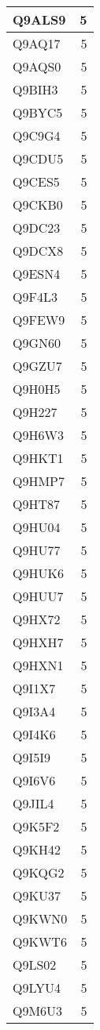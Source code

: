 \documentclass[
]{book}
\theoremstyle{definition}
\theoremstyle{definition}
\theoremstyle{definition}
\theoremstyle{definition}
\theoremstyle{remark}
\begin{document}
\begin{table}
\begin{tabular}{l|r}
\hline
Q9ALS9 & 5\\
\hline
Q9AQ17 & 5\\
\hline
Q9AQS0 & 5\\
\hline
Q9BIH3 & 5\\
\hline
Q9BYC5 & 5\\
\hline
Q9C9G4 & 5\\
\hline
Q9CDU5 & 5\\
\hline
Q9CES5 & 5\\
\hline
Q9CKB0 & 5\\
\hline
Q9DC23 & 5\\
\hline
Q9DCX8 & 5\\
\hline
Q9ESN4 & 5\\
\hline
Q9F4L3 & 5\\
\hline
Q9FEW9 & 5\\
\hline
Q9GN60 & 5\\
\hline
Q9GZU7 & 5\\
\hline
Q9H0H5 & 5\\
\hline
Q9H227 & 5\\
\hline
Q9H6W3 & 5\\
\hline
Q9HKT1 & 5\\
\hline
Q9HMP7 & 5\\
\hline
Q9HT87 & 5\\
\hline
Q9HU04 & 5\\
\hline
Q9HU77 & 5\\
\hline
Q9HUK6 & 5\\
\hline
Q9HUU7 & 5\\
\hline
Q9HX72 & 5\\
\hline
Q9HXH7 & 5\\
\hline
Q9HXN1 & 5\\
\hline
Q9I1X7 & 5\\
\hline
Q9I3A4 & 5\\
\hline
Q9I4K6 & 5\\
\hline
Q9I5I9 & 5\\
\hline
Q9I6V6 & 5\\
\hline
Q9JIL4 & 5\\
\hline
Q9K5F2 & 5\\
\hline
Q9KH42 & 5\\
\hline
Q9KQG2 & 5\\
\hline
Q9KU37 & 5\\
\hline
Q9KWN0 & 5\\
\hline
Q9KWT6 & 5\\
\hline
Q9LS02 & 5\\
\hline
Q9LYU4 & 5\\
\hline
Q9M6U3 & 5\\

\end{tabular}
\end{table}
\end{document}
